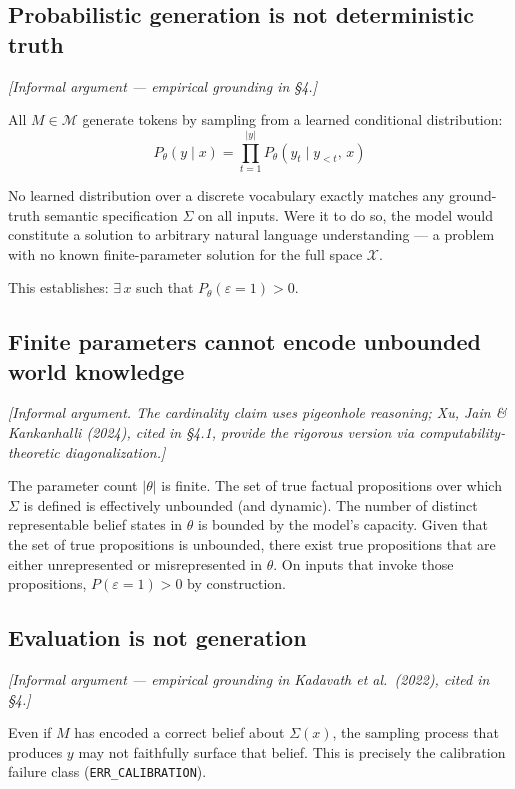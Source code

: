 \documentclass[11pt,a4paper]{article}
\begin{document}
\subsection{Probabilistic generation is not deterministic truth}

\emph{[Informal argument --- empirical grounding in \S4.]}

All $M \in \mathcal{M}$ generate tokens by sampling from a learned conditional distribution:
\begin{equation}
P_\theta(y \mid x) = \prod_{t=1}^{|y|} P_\theta(y_t \mid y_{<t},\, x)
\end{equation}

No learned distribution over a discrete vocabulary exactly matches any ground-truth semantic specification $\Sigma$ on all inputs. Were it to do so, the model would constitute a solution to arbitrary natural language understanding --- a problem with no known finite-parameter solution for the full space $\mathcal{X}$.

This establishes: $\exists\, x$ such that $P_\theta(\varepsilon = 1) > 0$.

\subsection{Finite parameters cannot encode unbounded world knowledge}

\emph{[Informal argument. The cardinality claim uses pigeonhole reasoning; Xu, Jain \& Kankanhalli (2024), cited in \S4.1, provide the rigorous version via computability-theoretic diagonalization.]}

The parameter count $|\theta|$ is finite. The set of true factual propositions over which $\Sigma$ is defined is effectively unbounded (and dynamic). The number of distinct representable belief states in $\theta$ is bounded by the model's capacity. Given that the set of true propositions is unbounded, there exist true propositions that are either unrepresented or misrepresented in $\theta$. On inputs that invoke those propositions, $P(\varepsilon = 1) > 0$ by construction.

\subsection{Evaluation is not generation}

\emph{[Informal argument --- empirical grounding in Kadavath et al.\ (2022), cited in \S4.]}

Even if $M$ has encoded a correct belief about $\Sigma(x)$, the sampling process that produces $y$ may not faithfully surface that belief. This is precisely the calibration failure class (\texttt{ERR\_CALIBRATION}).
\end{document}
